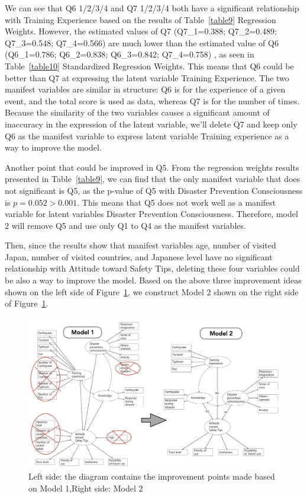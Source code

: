 We can see that Q6 1/2/3/4 and Q7 1/2/3/4 both have a significant relationship with Training Experience based on the results of Table~\ref{table9} Regression Weights. However, the estimated values of Q7 (Q7\_1=0.388; Q7\_2=0.489; Q7\_3=0.548; Q7\_4=0.566) are much lower than the estimated value of Q6 (Q6\_1=0.786; Q6\_2=0.838; Q6\_3=0.842; Q7\_4=0.758) , as seen in Table~\ref{table10} Standardized Regression Weights. This means that Q6 could be better than Q7 at expressing the latent variable Training Experience. The two manifest variables are similar in structure: Q6 is for the experience of a given event, and the total score is used as data, whereas Q7 is for the number of times. Because the similarity of the two variables causes a significant amount of inaccuracy in the expression of the latent variable, we'll delete Q7 and keep only Q6 as the manifest variable to express latent variable Training experience as a way to improve the model. 

Another point that could be improved in Q5. From the regression weights results presented in Table~\ref{table9}, we can find that the only manifest variable that does not significant is Q5, as the p-value of Q5 with Disaster Prevention Consciousness is $p=0.052>0.001$. This means that Q5 does not work well as a manifest variable for latent variables Disaster Prevention Consciousness. Therefore, model 2 will remove Q5 and use only Q1 to Q4 as the manifest variables.

Then, since the results show that manifest variables age, number of visited Japan, number of visited countries, and Japanese level have no significant relationship with Attitude toward Safety Tips, deleting these four variables could be also a way to improve the model. 
Based on the above three improvement ideas shown on the left side of Figure~\ref{fig25}, we construct Model 2 shown on the right side of Figure~\ref{fig25}.

\begin{figure}[t]
  \includegraphics[width=\linewidth]{Figure/Figure25.png}
  \centering
  \caption[SEM model 2]{Left side: the diagram contains the improvement points made based on Model 1,Right side: Model 2}
  \label{fig25}
\end{figure}


